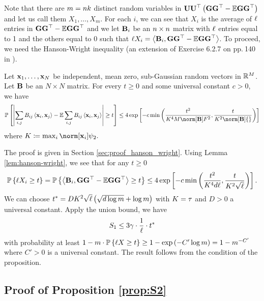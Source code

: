 Note that there are $m=nk$ distinct random variables in
$\mathbf{U}\mathbf{U}{\displaystyle ^{\top}}\left(\mathbf{G}\mathbf{G}{\displaystyle ^{\top}}-\mathbb{E}\mathbf{G}\mathbf{G}{\displaystyle ^{\top}}\right)$ and let us call them $X_{1},\ldots,X_{m}$.
For each $i$, we can see that $X_{i}$ is the average of $\ell$
entries in $\mathbf{G}\mathbf{G}{\displaystyle ^{\top}}-\mathbb{E}\mathbf{G}\mathbf{G}{\displaystyle ^{\top}}$ and we let $\mathbf{B}_{i}$ be an $n\times n$
matrix with $\ell$ entries equal to 1 and the others equal to 0
such that $\ell X_{i}=\left\langle \mathbf{B}_{i},\mathbf{G}\mathbf{G}{\displaystyle ^{\top}}-\mathbb{E}\mathbf{G}\mathbf{G}{\displaystyle ^{\top}}\right\rangle $.
To proceed, we need the Hanson-Wright inequality (an extension of
Exercise 6.2.7 on pp.$\ $140 in \citet{vershynin2017high}).
\begin{lem}
\emph{ \label{lem:hanson-wright} }Let $\mathbf{x}_{1},\ldots,\mathbf{x}_{N}$ be
independent, mean zero, sub-Gaussian random vectors in $\mathbb{R}^{M}$.
Let $\mathbf{B}$ be an $N\times N$ matrix. For every $t\geq0$ and some
universal constant $c>0$, we have 
\[
\P\left[\left|\sum_{i,j}B_{ij}\left\langle \x_{i},\x_{j}\right\rangle -\E\sum_{i,j}B_{ij}\left\langle \x_{i},\x_{j}\right\rangle \right|\geq t\right]\leq4\exp\left[-c\min\left(\frac{t^{2}}{K^{4}M\norm[\B]F^{2}},\frac{t}{K^{2}\norm[\B]{}}\right)\right]
\]
where $K\coloneqq\max_{i}\norm[\x_{i}]{\psi_{2}}.$ 
\end{lem}
The proof is given in Section \ref{sec:proof_hanson_wright}. Using
Lemma \ref{lem:hanson-wright}, we see that for any $t\ge0$ 
\[
\mathbb{P}\left\{ \ell X_{i}\geq t\right\} =\mathbb{P}\left\{ \left\langle \mathbf{B}_{i},\mathbf{G}\mathbf{G}{\displaystyle ^{\top}}-\mathbb{E}\mathbf{G}\mathbf{G}{\displaystyle ^{\top}}\right\rangle \geq t\right\} \leq4\exp\left[-c\min\left(\frac{t^{2}}{K^{4}d\ell},\frac{t}{K^{2}\sqrt{\ell}}\right)\right].
\]
We can choose $t^{*}=DK^{2}\sqrt{\ell}\left(\sqrt{d\log m}+\log m\right)$
with $K=\tau$ and $D>0$ a universal constant. Apply the union
bound, we have 
\[
S_{1}\leq3\gamma\cdot\frac{1}{\ell}\cdot t^{*}
\]
with probability at least $1-m\cdot\mathbb{P}\left\{ \ell X\geq t\right\} \geq1-\exp\left(-C'\log m\right)=1-m^{-C'}$
where $C'>0$ is a universal constant. The result follows from the
condition of the proposition.

\subsection{Proof of Proposition \ref{prop:S2} \label{sec:proof_S2}}

